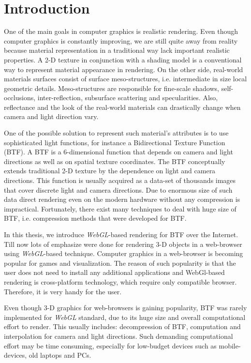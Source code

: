 \chapter{Introduction}
\label{chapter:introduction}

One of the main goals in computer graphics is realistic rendering. 
Even though computer graphics is constantly improving, we are still quite away from reality because material representation in a traditional way lack important realistic properties. 
A 2-D texture in conjunction with a shading model is a conventional way to represent material appearance in rendering.
On the other side, real-world materials surfaces consist of surface meso-structures, i.e. intermediate in size local geometric details.
Meso-structures are responsible for fine-scale shadows, self-occlusions, inter-reflection, subsurface scattering and specularities.
Also, reflectance and the look of the real-world materials can drastically change when camera and light direction vary.

One of the possible solution to represent such material's attributes is to use sophisticated light functions, for instance a Bidirectional Texture Function (BTF). 
 A BTF is a 6-dimensional function that depends on camera and light directions as well as on spatial texture coordinates. 
The BTF conceptually extends traditional 2-D texture by the dependence on light and camera directions.
This function is usually acquired as a data-set of thousands images that cover discrete light and camera directions.
Due to enormous size of such data direct rendering even on the modern hardware without any compression is impractical.
Fortunately, there exist many techniques to deal with huge size of BTF, i.e. compression methods that were developed for BTF.


In this thesis, we introduce \emph{WebGL}-based rendering for BTF over the Internet.
Till now lots of emphasize were done for rendering 3-D objects in a web-browser using \emph{WebGL}-based technique.
Computer graphics in a web-browser is becoming popular for games and visualization.
The reason of such popularity is that the user does not need to install any additional applications and WebGl-based rendering is cross-platform technology, which require only compatible browser.
Therefore, it is very handy for the user.

Even though 3-D graphics for web-browsers is gaining popularity, BTF was rarely implemented for \emph{WebGL} standard, due to its huge size and overall computational effort to render.
This usually includes: decompression of BTF, computation  and interpolation for camera and light directions.
Such demanding computational effort may be time consuming, especially for low-budget devices such as mobile-devices, old laptops and PCs.

